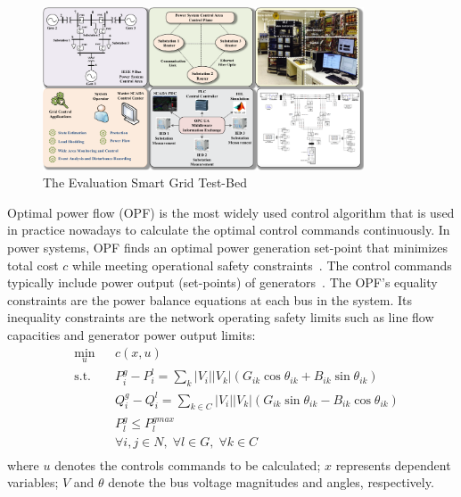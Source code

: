 \begin{figure}[ht]
  \centering
  \includegraphics[width=0.85\textwidth]{figures/testbed2}
  \vspace{-0.0in}
  \caption{The Evaluation Smart Grid Test-Bed}
  \vspace{-0.1in}
  \label{fig:testbed}
\end{figure}





Optimal power flow (OPF) is the most widely used control algorithm that is used in practice nowadays to calculate the optimal control commands continuously. In power systems, OPF finds an optimal power generation set-point that minimizes total cost $c$ while meeting operational safety constraints~\cite{FERCOPF}.  The control commands typically include power output (set-points) of generators~\cite{Tinney1968}. The OPF's equality constraints are the power balance equations at each bus in the system. Its inequality constraints are the network operating safety limits such as line flow capacities and generator power output limits:
\begin{equation} \label{eqn:opf}
\begin{aligned}
& \underset{u}{\min} & & c(x, u) \\
& \text{s.t.} & &  P_i^g - P_i^l = \sum_{k}{|V_i||V_k| (G_{ik} \cos{\theta_{ik}} + B_{ik} \sin{\theta_{ik}})} \\
& & &  Q_i^g - Q_i^l = \sum_{k \in C}{|V_i||V_k| (G_{ik} \sin{\theta_{ik}} - B_{ik} \cos{\theta_{ik}})} \\
& & &  P_l^g \leq P^{gmax}_l\\
& & &  \forall i,j \in N, \; \forall l \in G, \; \forall k \in C \\
\end{aligned}
\end{equation} 
where $u$ denotes the controls commands to be calculated; $x$ represents dependent variables; $V$ and $\mathit{\theta}$ denote the bus voltage magnitudes and angles, respectively.


